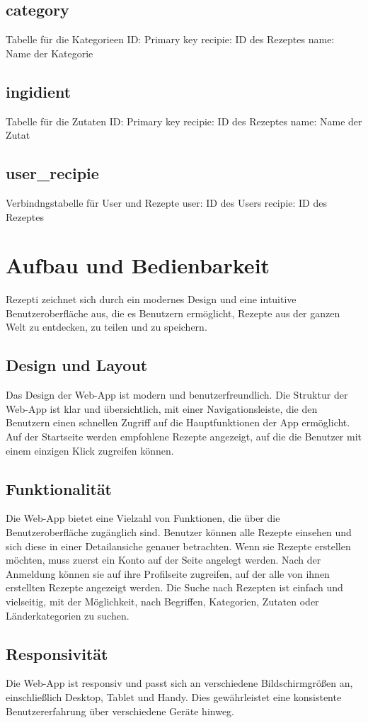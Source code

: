 \documentclass{article}
\begin{document}
\subsection{category}
Tabelle für die Kategorieen
ID: Primary key
\newline
recipie: ID des Rezeptes
\newline
name: Name der Kategorie

\subsection{ingidient}
Tabelle für die Zutaten
ID: Primary key
\newline
recipie: ID des Rezeptes
\newline
name: Name der Zutat

\subsection{user\_recipie}
Verbindngstabelle für User und Rezepte
user: ID des Users
\newline
recipie: ID des Rezeptes

\pagebreak

\section{Aufbau und Bedienbarkeit}
Rezepti zeichnet sich durch ein modernes Design und eine intuitive Benutzeroberfläche aus, die es Benutzern ermöglicht, Rezepte aus der ganzen Welt zu entdecken, zu teilen und zu speichern.

\subsection{Design und Layout}
Das Design der Web-App ist modern und benutzerfreundlich. Die Struktur der Web-App ist klar und übersichtlich, mit einer Navigationsleiste, die den Benutzern einen schnellen Zugriff auf die Hauptfunktionen der App ermöglicht. Auf der Startseite werden empfohlene Rezepte angezeigt, auf die die Benutzer mit einem einzigen Klick zugreifen können.

\subsection{Funktionalität}
Die Web-App bietet eine Vielzahl von Funktionen, die über die Benutzeroberfläche zugänglich sind. Benutzer können alle Rezepte einsehen und sich diese in einer Detailansiche genauer betrachten. Wenn sie Rezepte erstellen möchten, muss zuerst ein Konto auf der Seite angelegt werden. Nach der Anmeldung können sie auf ihre Profilseite zugreifen, auf der alle von ihnen  erstellten Rezepte angezeigt werden.  Die Suche nach Rezepten ist einfach und vielseitig, mit der Möglichkeit, nach Begriffen, Kategorien, Zutaten oder Länderkategorien zu suchen.

\subsection{Responsivität}
Die Web-App ist responsiv und passt sich an verschiedene Bildschirmgrößen an, einschließlich Desktop, Tablet und Handy. Dies gewährleistet eine konsistente Benutzererfahrung über verschiedene Geräte hinweg.
\end{document}
